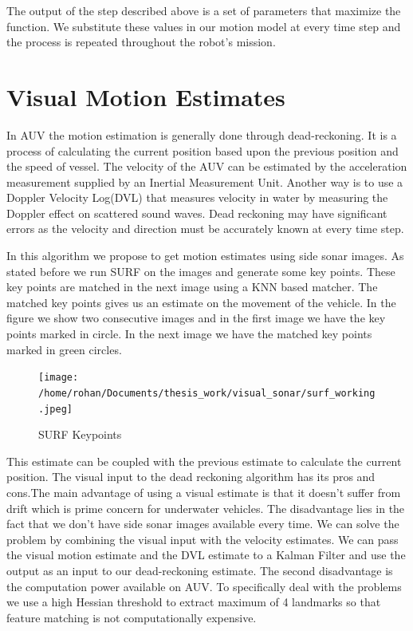 \documentclass[12pt]{dalcsthesis}
\begin{document}
The output of the step described above is a set of parameters that
maximize the function. We substitute these values in our motion model
at every time step and the process is repeated throughout the robot's
mission. 
\section{Visual Motion Estimates}
In AUV the motion estimation is generally done through dead-reckoning.
It is a process of calculating the current position based upon the
previous position and the speed of vessel. The velocity of the AUV
can be estimated by the acceleration measurement supplied by an Inertial
Measurement Unit. Another way is to use a Doppler Velocity Log(DVL) that
measures velocity in water by measuring the Doppler effect on scattered
sound waves. Dead reckoning may have significant errors as the velocity
and direction must be accurately known at every time step. 

In this algorithm we propose to get motion estimates using side sonar
images. As stated before we run SURF on the images and generate some
key points. These key points are matched in the next image using a
KNN based matcher. The matched key points gives us an estimate on
the movement of the vehicle. In the figure we show two consecutive
images and in the first image we have the key points marked in circle.
In the next image we have the matched key points marked in green circles. 
\begin{figure}[hbtp]
\caption{SURF Keypoints}
\centering
\texttt{[image: /home/rohan/Documents/thesis\_work/visual\_sonar/surf\_working.jpeg]}
\end{figure}
This estimate can be coupled with the previous estimate to calculate
the current position. The visual input to the dead reckoning algorithm
has its pros and cons.The main advantage of using a visual estimate
is that it doesn't suffer from drift which is prime concern for underwater
vehicles. The disadvantage lies in the fact that we don't have side
sonar images available every time. We can solve the problem by combining
the visual input with the velocity estimates. We can pass the visual
motion estimate and the DVL estimate to a Kalman Filter and use the
output as an input to our dead-reckoning estimate. The second disadvantage
is the computation power available on AUV. To specifically deal with
the problems we use a high Hessian threshold to extract maximum of
4 landmarks so that feature matching is not computationally expensive. 
\end{document}
